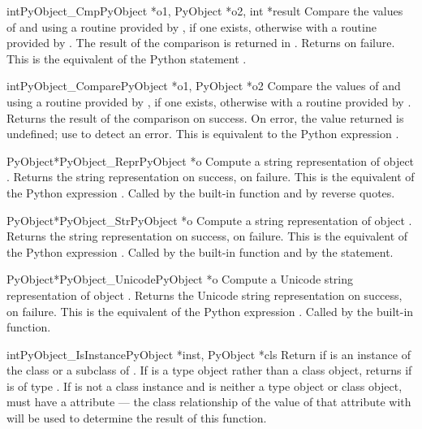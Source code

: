 \documentclass{manual}
\begin{document}
\begin{cfuncdesc}{int}{PyObject_Cmp}{PyObject *o1, PyObject *o2, int *result}
Compare the values of  and  using a routine provided
by , if one exists, otherwise with a routine provided by
.  The result of the comparison is returned in .
Returns  on failure.  This is the equivalent of the Python
statement .
\end{cfuncdesc}


\begin{cfuncdesc}{int}{PyObject_Compare}{PyObject *o1, PyObject *o2}
Compare the values of  and  using a routine provided
by , if one exists, otherwise with a routine provided by
.  Returns the result of the comparison on success.  On error,
the value returned is undefined; use  to
detect an error.  This is equivalent to the Python
expression .
\end{cfuncdesc}


\begin{cfuncdesc}{PyObject*}{PyObject_Repr}{PyObject *o}
Compute a string representation of object .  Returns the
string representation on success, \NULL{} on failure.  This is
the equivalent of the Python expression .
Called by the  built-in function
and by reverse quotes.
\end{cfuncdesc}


\begin{cfuncdesc}{PyObject*}{PyObject_Str}{PyObject *o}
Compute a string representation of object .  Returns the
string representation on success, \NULL{} on failure.  This is
the equivalent of the Python expression .
Called by the  built-in function and
by the  statement.
\end{cfuncdesc}


\begin{cfuncdesc}{PyObject*}{PyObject_Unicode}{PyObject *o}
Compute a Unicode string representation of object .  Returns the
Unicode string representation on success, \NULL{} on failure.  This is
the equivalent of the Python expression .
Called by the  built-in function.
\end{cfuncdesc}

\begin{cfuncdesc}{int}{PyObject_IsInstance}{PyObject *inst, PyObject *cls}
Return  if  is an instance of the class  or
a subclass of .  If  is a type object rather than a
class object,  returns  if
 is of type .  If  is not a class
instance and  is neither a type object or class object,
 must have a  attribute --- the class
relationship of the value of that attribute with  will be
used to determine the result of this function.
\end{cfuncdesc}
\end{document}

